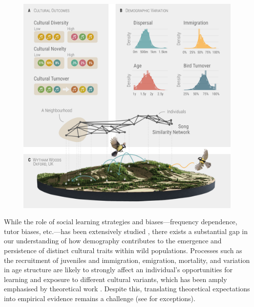 \documentclass[9pt, twocolumn, twoside]{gsajnl}
\begin{document}
\begin{figure}[!hbt]
    \centering
    \includegraphics[width=\linewidth]{figures/chapter_4/FIG1.pdf}
    \label{c4_fig:main}
\end{figure}

While the role of social learning strategies and biases---frequency dependence, tutor biases, etc.---has been extensively studied \parencite{pike2010, kendal2015, aplin2017, lachlan2018, tchernichovski2021}, there exists a substantial gap in our understanding of how demography contributes to the emergence and persistence of distinct cultural traits within wild populations. Processes such as the recruitment of juveniles and immigration, emigration, mortality, and variation in age structure are likely to strongly affect an individual's opportunities for learning and exposure to different cultural variants, which has been amply emphasised by theoretical work \parencite{deffner2022a, deffner2022, kandler2023, fogarty2019, deffner2020, derex2016, kirby2021, nunn2009, barta2023}. Despite this, translating theoretical expectations into empirical evidence remains a challenge (see \cite{chimento2021, fayet2014}  for exceptions).
\end{document}
